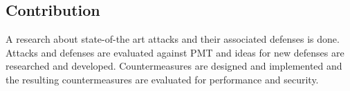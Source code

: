 \subsection{Contribution}
A research about state-of-the art attacks and their associated defenses is done. Attacks and defenses are evaluated against \gls{PMT} and ideas for new defenses are researched and developed. Countermeasures are designed and implemented and the resulting countermeasures are evaluated for performance and security.